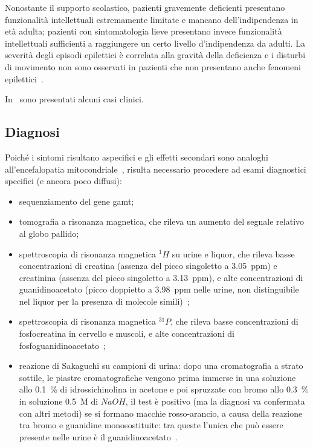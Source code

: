 		Nonostante il supporto scolastico, pazienti gravemente deficienti presentano funzionalit\`a intellettuali estremamente limitate e mancano dell'indipendenza in et\`a adulta; pazienti con sintomatologia lieve presentano invece funzionalit\`a intellettuali sufficienti a raggiungere un certo livello d'indipendenza da adulti.
		La severit\`a degli episodi epilettici \`e correlata alla gravit\`a della deficienza e i disturbi di movimento non sono osservati in pazienti che non presentano anche fenomeni epilettici~\cite{stockler2014guanidinoacetate}.
		
		In~\cite{araujo2005guanidinoacetate,ganesan1997guanidinoacetate,mikati2013epileptic,o2009guanidinoacetate,vodopiutz2007severe} sono presentati alcuni casi clinici.
		
		\subsection{Diagnosi}
		Poich\'e i sintomi risultano aspecifici e gli effetti secondari sono analoghi all'encefalopatia mitocondriale~\cite{gordon2010guanidinoacetate}, risulta necessario procedere ad esami diagnostici specifici (e ancora poco diffusi):
		\begin{itemize}
			\item sequenziamento del gene gamt;
			\item tomografia a risonanza magnetica, che rileva un aumento del segnale relativo al globo pallido;
			\item spettroscopia di risonanza magnetica $^1H$ su urine e liquor, che rileva basse concentrazioni di creatina (assenza del picco singoletto a \SI{3.05}{ppm}) e creatinina (assenza del picco singoletto a \SI{3.13}{ppm}), e alte concentrazioni di guanidinoacetato (picco doppietto a \SI{3.98}{ppm} nelle urine, non distinguibile nel liquor per la presenza di molecole simili)~\cite{engelke2009guanidinoacetate};
			\item spettroscopia di risonanza magnetica $^{31}P$, che rileva basse concentrazioni di fosfocreatina in cervello e muscoli, e alte concentrazioni di fosfoguanidinoacetato~\cite{renema2003mr};
			\item reazione di Sakaguchi su campioni di urina: dopo una cromatografia a strato sottile, le piastre cromatografiche vengono prima immerse in una soluzione allo \SI{0.1}{\percent} di idrossichinolina in acetone e poi spruzzate con bromo allo \SI{0.3}{\percent} in soluzione \SI{0.5}{M} di $NaOH$, il test \`e positivo (ma la diagnosi va confermata con altri metodi) se si formano macchie rosso-arancio, a causa della reazione tra bromo e guanidine monosostituite: tra queste l'unica che pu\`o essere presente nelle urine \`e il guanidinoacetato~\cite{schulze1996sakaguchi}.
		\end{itemize}
		
